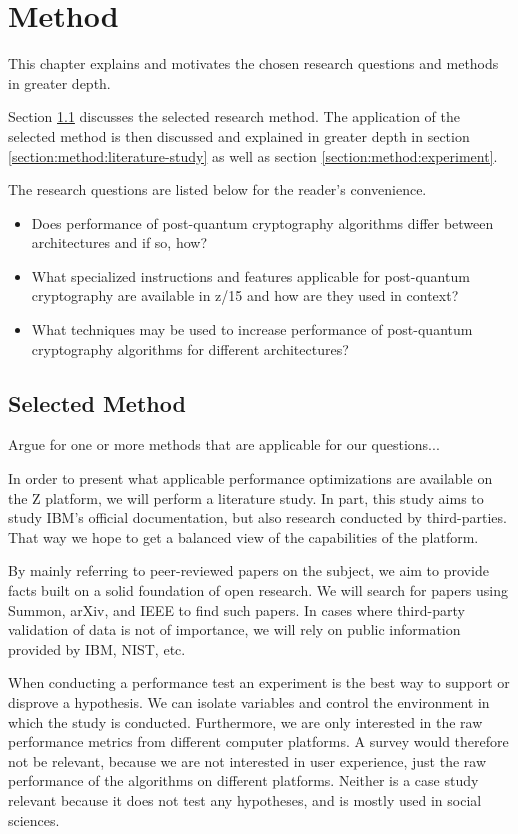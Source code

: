 \chapter{Method}
\label{chapter:method}

This chapter explains and motivates the chosen research questions and methods in greater depth.

Section \ref{section:method:selected-method} discusses the selected research method. The application of the selected method is then discussed and explained in greater depth in section \ref{section:method:literature-study} as well as section \ref{section:method:experiment}.

The research questions are listed below for the reader's convenience.

\begin{itemize}
    \item Does performance of post-quantum cryptography algorithms differ between architectures and if so, how?
    \item What specialized instructions and features applicable for post-quantum cryptography are available in z/15 and how are they used in context?
    \item What techniques may be used to increase performance of post-quantum cryptography algorithms for different architectures?
\end{itemize}

\section{Selected Method}
\label{section:method:selected-method}

Argue for one or more methods that are applicable for our questions...

In order to present what applicable performance optimizations are available on the Z platform, we will perform a literature study. In part, this study aims to study IBM's official documentation, but also research conducted by third-parties. That way we hope to get a balanced view of the capabilities of the platform.

By mainly referring to peer-reviewed papers on the subject, we aim to provide facts built on a solid foundation of open research. We will search for papers using Summon, arXiv, and IEEE to find such papers. In cases where third-party validation of data is not of importance, we will rely on public information provided by IBM, NIST, etc.

When conducting a performance test an experiment is the best way to support or disprove a hypothesis. We can isolate variables and control the environment in which the study is conducted. Furthermore, we are only interested in the raw performance metrics from different computer platforms. A survey would therefore not be relevant, because we are not interested in user experience, just the raw performance of the algorithms on different platforms. Neither is a case study relevant because it does not test any hypotheses, and is mostly used in social sciences\cite{wohlin2012experimentation}.

